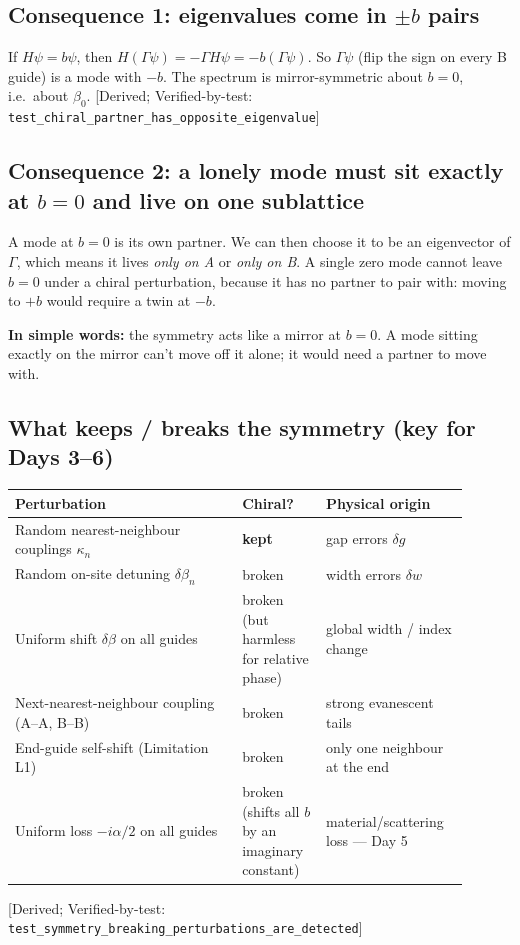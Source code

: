 \documentclass[10pt,a4paper]{article}
\newcommand{\evd}[1]{\textsf{\small[#1]}}
\newcommand{\simple}[1]{\par\noindent\textbf{In simple words:} #1\par\smallskip}
\begin{document}
\subsection{Consequence 1: eigenvalues come in $\pm b$ pairs}
If $H\psi=b\psi$, then $H(\Gamma\psi)=-\Gamma H\psi=-b(\Gamma\psi)$. So $\Gamma\psi$ (flip the sign on every B guide) is a mode with $-b$. The spectrum is mirror-symmetric about $b=0$, i.e.\ about $\beta_0$. \evd{Derived; Verified-by-test: \texttt{test\_chiral\_partner\_has\_opposite\_eigenvalue}}

\subsection{Consequence 2: a lonely mode must sit exactly at $b=0$ and live on one sublattice}
A mode at $b=0$ is its own partner. We can then choose it to be an eigenvector of $\Gamma$, which means it lives \emph{only on A} or \emph{only on B}. A single zero mode cannot leave $b=0$ under a chiral perturbation, because it has no partner to pair with: moving to $+b$ would require a twin at $-b$.
\simple{the symmetry acts like a mirror at $b=0$. A mode sitting exactly on the mirror can't move off it alone; it would need a partner to move with.}

\subsection{What keeps / breaks the symmetry (key for Days 3--6)}
\begin{tabular}{@{}p{0.46\linewidth}p{0.17\linewidth}p{0.27\linewidth}@{}}\toprule
Perturbation & Chiral? & Physical origin\\\midrule
Random nearest-neighbour couplings $\kappa_n$ & \textbf{kept} & gap errors $\delta g$\\
Random on-site detuning $\delta\beta_n$ & broken & width errors $\delta w$\\
Uniform shift $\delta\beta$ on all guides & broken (but harmless for relative phase) & global width / index change\\
Next-nearest-neighbour coupling (A--A, B--B) & broken & strong evanescent tails\\
End-guide self-shift (Limitation L1) & broken & only one neighbour at the end\\
Uniform loss $-i\alpha/2$ on all guides & broken (shifts all $b$ by an imaginary constant) & material/scattering loss --- Day 5\\\bottomrule
\end{tabular}\par\smallskip\noindent\evd{Derived; Verified-by-test: \texttt{test\_symmetry\_breaking\_perturbations\_are\_detected}}
\end{document}
